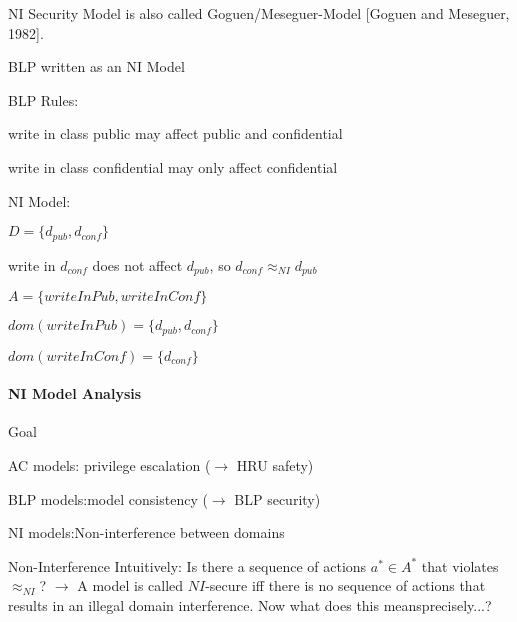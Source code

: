 \documentclass[a4paper]{article}
\begin{document}
\begin{multicols}{3}
    NI Security Model is also called Goguen/Meseguer-Model [Goguen and Meseguer, 1982].

    BLP written as an NI Model
    \begin{itemize*}
        \item BLP Rules:
              \begin{itemize*}
                  \item write in class public may affect public and confidential
                  \item write in class confidential may only affect confidential
              \end{itemize*}
        \item NI Model:
              \begin{itemize*}
                  \item $D=\{d_{pub},d_{conf}\}$
                  \item write in $d_{conf}$ does not affect $d_{pub}$, so $d_{conf} \approx_{NI} d_{pub}$
                  \item $A=\{writeInPub, writeInConf\}$
                  \item $dom(writeInPub)=\{d_{pub},d_{conf}\}$
                  \item $dom(writeInConf)=\{d_{conf}\}$
              \end{itemize*}
    \end{itemize*}

    \paragraph{NI Model Analysis}
    Goal
    \begin{itemize*}
        \item AC models: privilege escalation ($\rightarrow$ HRU safety)
        \item BLP models:model consistency ($\rightarrow$ BLP security)
        \item NI models:Non-interference between domains
    \end{itemize*}

    Non-Interference Intuitively:
    Is there a sequence of actions $a^*\in A^*$ that violates $\approx_{NI}$? $\rightarrow$ A model is called $NI$-secure iff there is no sequence of actions that results in an illegal domain interference. Now what does this meansprecisely...?


\end{multicols}
\end{document}
